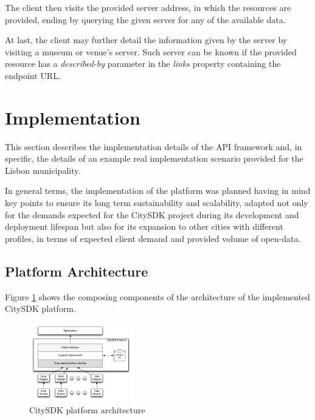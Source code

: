 \documentclass[times]{ettauth}
\begin{document}
The client then visits the provided server address, in which the resources are provided, ending by querying the given server for any of the available data. 

At last, the client may further detail the information given by the server by visiting a museum or venue's server. Such server can be known if the provided resource has a \textit{described-by} parameter in the \textit{links} property containing the endpoint URL.

\section{Implementation}
\label{s:implementation}
This section describes the implementation details of the API framework and, in specific, the details of an example real implementation scenario provided for the Lisbon municipality. 

In general terms, the implementation of the platform was planned having in mind key points to ensure its long term sustainability and scalability, adapted not only for the demands expected for the CitySDK project during its development and deployment lifespan but also for its expansion to other cities with different profiles, in terms of expected client demand and provided volume of open-data.

\subsection{Platform Architecture}
Figure \ref{fig:architecture} shows the composing components of the architecture of the implemented CitySDK platform. 

\begin{figure}[!ht]
\centering
\includegraphics[width=0.4\textwidth]{images/architecture}
\caption{CitySDK platform architecture}
\label{fig:architecture}
\end{figure}
\end{document}
